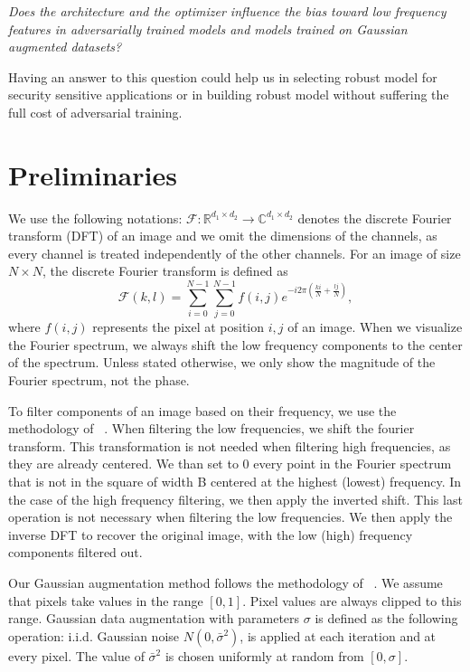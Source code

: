 \documentclass{article} \author{Simon Théorêt}
\begin{document}
\textit{Does the architecture and the optimizer influence the bias
  toward low frequency features in adversarially trained models and
  models trained on Gaussian augmented datasets?}

Having an answer to this question could help us in selecting robust
model for security sensitive applications or in building robust model
without suffering the full cost of adversarial training.
\section{Preliminaries}
We use the following notations:
$\mathcal{F}: \mathbb{R}^{d_{1} \times d_{2}} \to
\mathbb{C}^{d_{1}\times d_{2}}$ denotes the discrete Fourier transform
(DFT) of an image and we omit the dimensions of the channels, as every
channel is treated independently of the other channels. For an image
of size $N \times N$, the discrete Fourier transform is defined as
\begin{equation}
  \mathcal{F}(k,l) =  \sum_{i=0}^{N-1} \sum_{j=0}^{N-1}f(i,j)e^{-i2\pi(\frac{ki}{N}+\frac{lj}{N})},
\end{equation}
where $f(i,j)$ represents the pixel at position $i,j$ of an
image. When we visualize the Fourier spectrum, we always shift the low
frequency components to the center of the spectrum. Unless stated
otherwise, we only show the magnitude of the Fourier spectrum, not the
phase.

To filter components of an image based on their frequency, we use the
methodology of ~\citep{yin2020fourier}. When filtering the low
frequencies, we shift the fourier transform. This transformation is
not needed when filtering high frequencies, as they are already
centered. We than set to 0 every point in the Fourier spectrum that is
not in the square of width B centered at the highest (lowest)
frequency. In the case of the high frequency filtering, we then apply
the inverted shift. This last operation is not necessary when
filtering the low frequencies. We then apply the inverse DFT to
recover the original image, with the low (high) frequency components
filtered out.

Our Gaussian augmentation method follows the methodology of
~\citep{yin2020fourier}. We assume that pixels take values in the
range $[0, 1]$. Pixel values are always clipped to this
range. Gaussian data augmentation with parameters $\sigma$ is defined
as the following operation: i.i.d. Gaussian noise
$N(0, \bar{\sigma}^{2})$, is applied at each iteration and at every
pixel. The value of $\bar{\sigma}^{2}$ is chosen uniformly at random
from $[0, \sigma]$.
\end{document}
